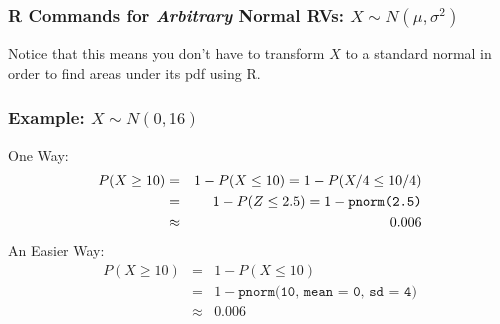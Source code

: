 \begin{frame}
  \frametitle{R Commands for \emph{Arbitrary} Normal RVs: $X \sim N(\mu, \sigma^2)$}
\begin{table}
\centering
{}
\end{table}
\vspace{1em}
\alert{Notice that this means you don't have to transform $X$ to a standard normal in order to find areas under its pdf using R.}
\end{frame}
\begin{frame}
\frametitle{Example: $X \sim N(0,16)$}

One Way:
			\begin{eqnarray*}
				P(X \geq 10) &=&  1 - P(X \leq 10) = 1 - P(X /4\leq 10/4)\\
				&=& 1 - P(Z\leq 2.5) =  1 - \mbox{\texttt{pnorm(2.5)}}\\ 
				&\approx& 0.006
			\end{eqnarray*}
\pause
An Easier Way:
	\begin{eqnarray*}
	P(X \geq 10) &=& 1 - P(X \leq 10)\\ 
	&=&  1 - \texttt{pnorm(10, mean = 0, sd = 4)} \\ 
	&\approx& 0.006
	\end{eqnarray*}
\end{frame}

